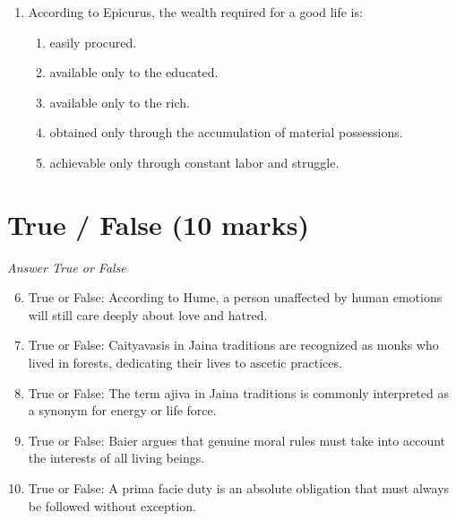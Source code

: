 \documentclass[12pt]{article}
\begin{document}
\begin{enumerate}[label=\arabic*.]
rules would require:
\begin{enumerate}[label=(\alph*)]
    \item in a world where moral rules are constantly changing.
    \item in a world in which everyone complied with those rules perfectly.
    \item in an ideal institutional setting.
    \item in a world where every individual creates their own rules.
    \item in a setting where institutions are corrupted.
\end{enumerate}
\item According to Epicurus, the wealth required for a good life is:
\begin{enumerate}[label=(\alph*)]
    \item easily procured.
    \item available only to the educated.
    \item available only to the rich.
    \item obtained only through the accumulation of material possessions.
    \item achievable only through constant labor and struggle.
\end{enumerate}
\end{enumerate}

\section*{True / False (10 marks)}
\textit{Answer True or False}
\begin{enumerate}[label=\arabic*.]
\setcounter{enumi}{5}
\item True or False: According to Hume, a person unaffected by human emotions will still care deeply about love and hatred.
\item True or False: Caityavasis in Jaina traditions are recognized as monks who lived in forests, dedicating their lives to ascetic practices.
\item True or False: The term ajiva in Jaina traditions is commonly interpreted as a synonym for energy or life force.
\item True or False: Baier argues that genuine moral rules must take into account the interests of all living beings.
\item True or False: A prima facie duty is an absolute obligation that must always be followed without exception.
\end{enumerate}
\end{document}
